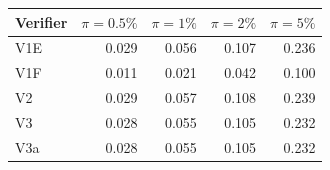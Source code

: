 \begin{tabular}{lrrrr}
\toprule
Verifier & $\pi=0.5\%$ & $\pi=1\%$ & $\pi=2\%$ & $\pi=5\%$ \\
\midrule
V1E & 0.029 & 0.056 & 0.107 & 0.236 \\
V1F & 0.011 & 0.021 & 0.042 & 0.100 \\
V2 & 0.029 & 0.057 & 0.108 & 0.239 \\
V3 & 0.028 & 0.055 & 0.105 & 0.232 \\
V3a & 0.028 & 0.055 & 0.105 & 0.232 \\
\bottomrule
\end{tabular}

